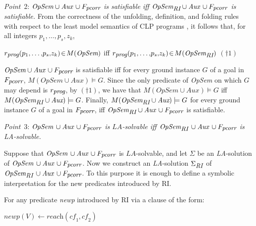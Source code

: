 \documentclass[english]{tlp}
\begin{document}
\medskip	
\noindent
{\it Point}~2: {\it $\textit{OpSem} \cup \textit{Aux}\, \cup F_{\textit{\small{pcorr}}}$ is satisfiable iff 
	$\textit{OpSem}_{\textit{\small{RI}}} \cup \textit{Aux}\, \cup F_{\textit{\small{pcorr}}}$ is satisfiable.}
From the correctness of the unfolding, definition, and folding rules with respect
to the least model semantics of CLP programs \cite{EtG96}, it follows that,
for all integers $p_1,\ldots,\!p_s,\!z_k$,

$r_{\textit{\small prog}}(p_1,\ldots,\!p_s,\!z_k)\!\in\! M(\textit{OpSem})$ iff 
	$r_{\textit{\small prog}}(p_1,\ldots,\!p_s,\!z_k)\!\in\! M(\textit{OpSem}_{\textit{\small{RI}}})$ \hfill $(\dagger1)$ ~~~
	
\noindent
$\textit{OpSem} \cup \textit{Aux}\, \cup F_{\textit{\small{pcorr}}}$ is satisfiable iff 
for every ground instance $G$ of a goal in $F_{\textit{\small{pcorr}}}$, $M(\textit{OpSem} \cup \textit{Aux})\models G$.
Since the only predicate of \textit{OpSem} on which $G$ may depend is $r_{\textit{\small prog}}$, by $(\dagger1)$,
we have that $M(\textit{OpSem} \cup \textit{Aux})\models G$ iff 
$M(\textit{OpSem}_{\textit{\small{RI}}} \cup \textit{Aux})\models G$.
Finally,  $M(\textit{OpSem}_{\textit{\small{RI}}} \cup \textit{Aux})\models G$
for every ground instance $G$ of a goal in $F_{\textit{\small{pcorr}}}$, iff
$\textit{OpSem}_{\textit{\small{RI}}} \cup \textit{Aux}\, \cup F_{\textit{\small{pcorr}}}$ is satisfiable.




\medskip	
\noindent
{\it Point}~3: {\it $\textit{OpSem}\, \cup \textit{Aux}\, \cup F_{\textit{\small{pcorr}}}$ is 
	${\textit{LA}}$-solvable iff $\textit{OpSem}_{\textit{\small{RI}}}\, \cup 
	\textit{Aux}\, \cup F_{\textit{\small{pcorr}}}$ is {\textit{LA}}-solvable.}

Suppose that $\textit{OpSem}\, \cup \textit{Aux}\, \cup F_{\textit{\small{pcorr}}}$ is 
${\textit{LA}}$-solvable, and let $\Sigma$ be an {\it LA}-solution of 
$\textit{OpSem}\, \cup \textit{Aux}\, \cup F_{\textit{\small{pcorr}}}$. 
Now we construct an {\it LA}-solution $\Sigma_{\textit{\small{RI}}}$ of $\textit{OpSem}_{\textit{\small{RI}}}\, \cup 
	\textit{Aux}\, \cup F_{\textit{\small{pcorr}}}$.
To this purpose it is enough to define a symbolic interpretation for
the new predicates introduced by RI.

For any predicate {\it newp} introduced by RI via a clause of the form:

\smallskip

$\textit{newp}(V)\leftarrow \textit{reach}(\textit{cf}_1,\textit{cf}_2)$
\end{document}
